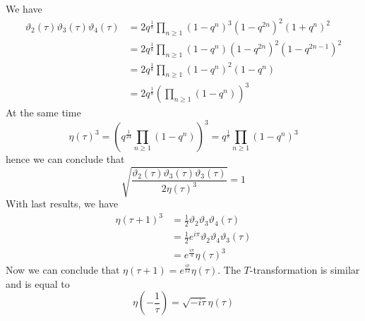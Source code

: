 \subsubsection{}
We have
\begin{equation}
	\begin{split}
	\vartheta_2(\tau) \vartheta_3(\tau) \vartheta_4(\tau) & = 2 q^{\frac{1}{8}} \prod_{n \geq 1} (1-q^n)^3 (1-q^{2n})^2(1+q^n)^2\\
	& = 2q^{\frac{1}{8}} \prod_{n \geq 1} (1-q^n)(1-q^{2n})^2(1-q^{2n-1})^2 \\
	& =2 q^{\frac{1}{8}} \prod_{n \geq 1} (1-q^n)^2(1-q^n)\\
	& = 2q^{\frac{1}{8}} \left(\prod_{n \geq 1} (1-q^n) \right)^3
	\end{split}
\end{equation}
At the same time
\[
\eta(\tau)^3 = (q^{\frac{1}{24}} \prod_{n \geq 1} (1-q^n))^3 = q^{\frac{1}{8}} \prod_{n \geq 1} (1-q^n)^3
\]
hence we can conclude that 
\begin{equation}
	\sqrt{\frac{\vartheta_2(\tau)\vartheta_3(\tau)\vartheta_3(\tau)}{2 \eta(\tau)^3}} =1
\end{equation}
With last results, we have 
\begin{equation}
	\begin{split}
	\eta(\tau +1)^3 &= \frac{1}{2} \vartheta_2 \vartheta_3 \vartheta_4(\tau)\\
	& = \frac{1}{2} e^{i \pi} \vartheta_2 \vartheta_4 \vartheta_3 (\tau)\\
	& = e^{\frac{i \pi}{4}} \eta(\tau)^3
	\end{split}
\end{equation}
Now we can conclude that $\eta(\tau +1)= e^{\frac{i \pi}{12}} \eta(\tau)$. The $T$-transformation is similar and is equal to
\[
\eta(- \frac{1}{\tau}) = \sqrt{-i \tau} \eta(\tau)
\]
